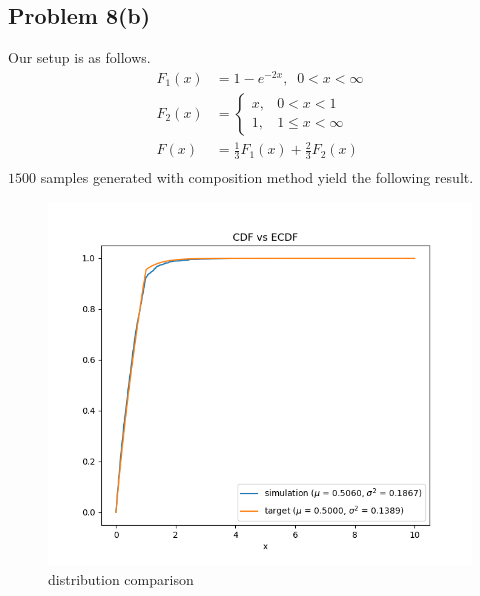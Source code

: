 \documentclass{article}
\begin{document}
\subsection*{Problem 8(b)}
Our setup is as follows.
\begin{align*}
  F_1(x) &= 1-e^{-2x},\;\; 0< x< \infty\\
  F_2(x) &= \begin{cases}
              x, & 0< x< 1\\
              1, & 1\le x<\infty
            \end{cases}\\
  F(x) &= \frac{1}{3}F_{1}(x) + \frac{2}{3}F_{2}(x)\\
\end{align*}
$1500$ samples generated with composition method yield the following result.
\begin{figure}[h!]
    \centering
    \includegraphics[width=\linewidth]{../images/p8b_dist_incomp_1500.png}
    \caption{distribution comparison}
\end{figure}
\newpage
\end{document}
